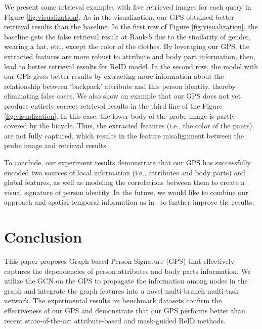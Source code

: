 \documentclass[final]{cvpr}
\begin{document}
We present some retrieval examples with five retrieved images for each query in Figure \ref{fig:visualization}. As in the visualization, our GPS obtained better retrieval results than the baseline. In the first row of Figure \ref{fig:visualization}, the baseline gets the false retrieval result at Rank-5 due to the similarity of gender, wearing a hat, etc., except the color of the clothes. By leveraging our GPS, the extracted features are more robust to attribute and body part information, then, lead to better retrieval results for ReID model. In the second row, the model with our GPS gives better results by extracting more information about the relationship between `backpack' attribute and this person identity, thereby eliminating false cases. We also show an example that our GPS does not yet produce entirely correct retrieval results in the third line of the Figure \ref{fig:visualization}. In this case, the lower body of the probe image is partly covered by the bicycle. Thus, the extracted features (i.e., the color of the pants) are not fully captured, which results in the feature misalignment between the probe image and retrieval results.

To conclude, our experiment results demonstrate that our GPS has successfully encoded two sources of local information (i.e., attributes and body parts) and global features, as well as modeling the correlations between them to create a visual signature of person identity. In the future, we would like to combine our approach and spatial-temporal information as in~\cite{st-ReID} to further improve the results.

















\section{Conclusion}
\label{sec:conclusion}
This paper proposes Graph-based Person Signature (GPS) that effectively captures the dependencies of person attributes and body parts information. We utilize the GCN on the GPS to propagate the information among nodes in the graph and integrate the graph features into a novel multi-branch multi-task network. The experimental results on benchmark datasets confirm the effectiveness of our GPS and demonstrate that our GPS performs better than recent state-of-the-art attribute-based and mask-guided ReID methods.

{\small


}
\end{document}
